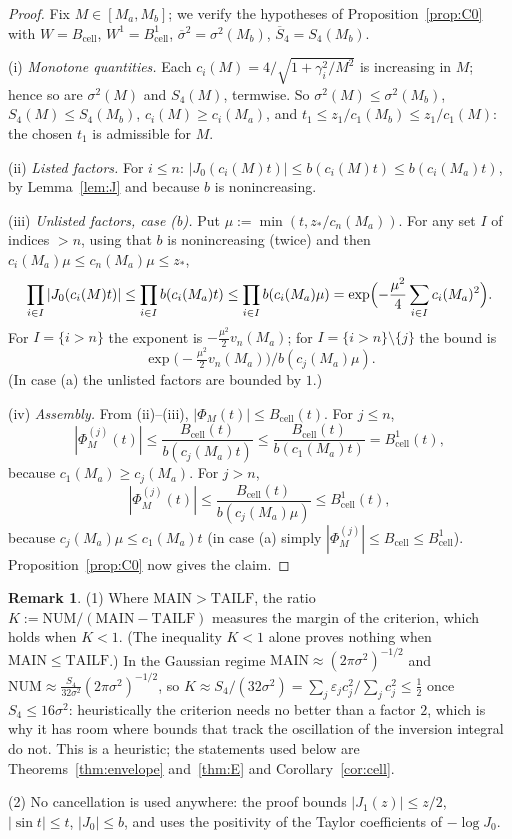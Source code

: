 \documentclass[11pt]{amsart}
\theoremstyle{definition}
\newtheorem{remark}[theorem]{Remark}
\numberwithin{equation}{section}
\newcommand{\eps}{\varepsilon}
\begin{document}
\begin{proof}
Fix $M\in[M_a,M_b]$; we verify the hypotheses of
Proposition~\ref{prop:C0} with $W=B_{\mathrm{cell}}$,
$W^1=B^1_{\mathrm{cell}}$, $\overline{\sigma}^2=\sigma^2(M_b)$,
$\overline S_4=S_4(M_b)$.

(i) \emph{Monotone quantities.} Each
$c_i(M)=4/\sqrt{1+\gamma_i^2/M^2}$ is increasing in $M$; hence so are
$\sigma^2(M)$ and $S_4(M)$, termwise. So
$\sigma^2(M)\le\sigma^2(M_b)$, $S_4(M)\le S_4(M_b)$,
$c_i(M)\ge c_i(M_a)$, and $t_1\le z_1/c_1(M_b)\le z_1/c_1(M)$: the
chosen $t_1$ is admissible for $M$.

(ii) \emph{Listed factors.} For $i\le n$:
$|J_0(c_i(M)t)|\le b(c_i(M)t)\le b(c_i(M_a)t)$, by Lemma~\ref{lem:J}
and because $b$ is nonincreasing.

(iii) \emph{Unlisted factors, case (b).} Put
$\mu:=\min(t,z_*/c_n(M_a))$. For any set $I$ of indices $>n$, using
that $b$ is nonincreasing (twice) and then
$c_i(M_a)\mu\le c_n(M_a)\mu\le z_*$,
\[
\prod_{i\in I}|J_0(c_i(M)t)|\le\prod_{i\in I}b(c_i(M_a)t)
\le\prod_{i\in I}b(c_i(M_a)\mu)
=\exp\Bigl(-\frac{\mu^2}{4}\sum_{i\in I}c_i(M_a)^2\Bigr).
\]
For $I=\{i>n\}$ the exponent is $-\frac{\mu^2}{2}v_n(M_a)$; for
$I=\{i>n\}\setminus\{j\}$ the bound is
\[
\exp\bigl(-\tfrac{\mu^2}{2}v_n(M_a)\bigr)\big/b(c_j(M_a)\mu).
\]
(In case (a) the unlisted factors are bounded by $1$.)

(iv) \emph{Assembly.} From (ii)--(iii),
$|\Phi_M(t)|\le B_{\mathrm{cell}}(t)$. For $j\le n$,
\[
|\Phi_M^{(j)}(t)|\le\frac{B_{\mathrm{cell}}(t)}{b(c_j(M_a)t)}
\le\frac{B_{\mathrm{cell}}(t)}{b(c_1(M_a)t)}=B^1_{\mathrm{cell}}(t),
\]
because $c_1(M_a)\ge c_j(M_a)$. For $j>n$,
\[
|\Phi_M^{(j)}(t)|\le\frac{B_{\mathrm{cell}}(t)}{b(c_j(M_a)\mu)}
\le B^1_{\mathrm{cell}}(t),
\]
because $c_j(M_a)\mu\le c_1(M_a)t$ (in case (a) simply
$|\Phi_M^{(j)}|\le B_{\mathrm{cell}}\le B^1_{\mathrm{cell}}$).
Proposition~\ref{prop:C0} now gives the claim.
\end{proof}

\begin{remark}\label{rem:K}
(1) Where $\mathrm{MAIN}>\mathrm{TAILF}$, the ratio
$K:=\mathrm{NUM}/(\mathrm{MAIN}-\mathrm{TAILF})$ measures the margin
of the criterion, which holds when $K<1$. (The inequality $K<1$ alone
proves nothing when $\mathrm{MAIN}\le\mathrm{TAILF}$.) In the Gaussian
regime $\mathrm{MAIN}\approx(2\pi\sigma^2)^{-1/2}$ and
$\mathrm{NUM}\approx\frac{S_4}{32\sigma^2}(2\pi\sigma^2)^{-1/2}$, so
$K\approx S_4/(32\sigma^2)=\sum_j\eps_jc_j^2/\sum_jc_j^2\le\tfrac12$
once $S_4\le16\sigma^2$: heuristically the criterion needs no better
than a factor $2$, which is why it has room where bounds that track
the oscillation of the inversion integral do not. This is a
heuristic; the statements used below are
Theorems~\ref{thm:envelope} and~\ref{thm:E} and
Corollary~\ref{cor:cell}.

(2) No cancellation is used anywhere: the proof bounds
$|J_1(z)|\le z/2$, $|\sin t|\le t$, $|J_0|\le b$, and uses the
positivity of the Taylor coefficients of $-\log J_0$.
\end{remark}
\end{document}
